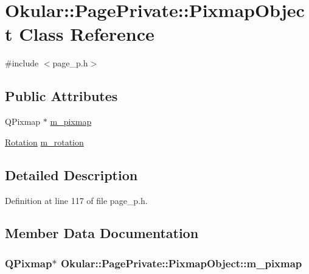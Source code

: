 \hypertarget{classOkular_1_1PagePrivate_1_1PixmapObject}{\section{Okular\+:\+:Page\+Private\+:\+:Pixmap\+Object Class Reference}
\label{classOkular_1_1PagePrivate_1_1PixmapObject}
}


{\ttfamily \#include $<$page\+\_\+p.\+h$>$}

\subsection*{Public Attributes}
\begin{DoxyCompactItemize}
\item 
Q\+Pixmap $\ast$ \hyperlink{classOkular_1_1PagePrivate_1_1PixmapObject_a47ae562486eb61aaf38115943c590d01}{m\+\_\+pixmap}
\item 
\hyperlink{namespaceOkular_a8556d00465f61ef533c6b027669e7da6}{Rotation} \hyperlink{classOkular_1_1PagePrivate_1_1PixmapObject_a3370c3f8f2ce0c7e4ace30a7b674a0dd}{m\+\_\+rotation}
\end{DoxyCompactItemize}


\subsection{Detailed Description}


Definition at line 117 of file page\+\_\+p.\+h.



\subsection{Member Data Documentation}
\hypertarget{classOkular_1_1PagePrivate_1_1PixmapObject_a47ae562486eb61aaf38115943c590d01}{
\subsubsection[{m\+\_\+pixmap}]{\setlength{\rightskip}{0pt plus 5cm}Q\+Pixmap$\ast$ Okular\+::\+Page\+Private\+::\+Pixmap\+Object\+::m\+\_\+pixmap}}\label{classOkular_1_1PagePrivate_1_1PixmapObject_a47ae562486eb61aaf38115943c590d01}


